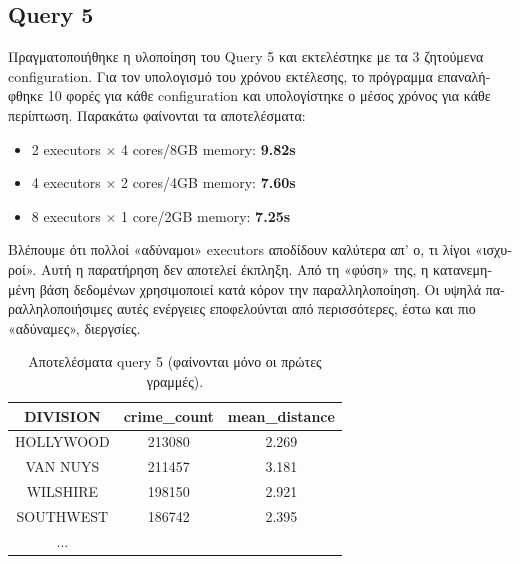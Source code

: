\documentclass[a4paper,12pt]{article}
\begin{document}
\begin{otherlanguage}{greek}
\section*{Query 5}
	\FloatBarrier
	\par Πραγματοποιήθηκε η υλοποίηση του Query 5 και εκτελέστηκε με τα 3
	ζητούμενα configuration. Για τον υπολογισμό του χρόνου εκτέλεσης, το πρόγραμμα
	επαναλήφθηκε 10 φορές για κάθε configuration και υπολογίστηκε ο μέσος χρόνος για
	κάθε περίπτωση. Παρακάτω φαίνονται τα αποτελέσματα:
	\begin{itemize}
		\item 2 executors $\times$ 4 cores/8GB memory: \textbf{9.82s}
		\item 4 executors $\times$ 2 cores/4GB memory: \textbf{7.60s}
		\item 8 executors $\times$ 1 core/2GB memory: \textbf{7.25s}
	\end{itemize}
	\par Βλέπουμε ότι πολλοί «αδύναμοι» executors αποδίδουν καλύτερα απ' ο, τι λίγοι
	«ισχυροί». Αυτή η παρατήρηση δεν αποτελεί έκπληξη. Από τη «φύση» της, η
	κατανεμημένη βάση δεδομένων χρησιμοποιεί κατά κόρον την παραλληλοποίηση. Οι
	υψηλά παραλληλοποιήσιμες αυτές ενέργειες εποφελούνται από περισσότερες, έστω
	και πιο «αδύναμες», διεργσίες.
	\begin{table}[h]
		\centering
		\begin{tabular}{ccc}
			DIVISION & crime\_count & mean\_distance \\
			\hline
			HOLLYWOOD & 213080 & 2.269 \\
			VAN NUYS & 211457 & 3.181 \\
			WILSHIRE & 198150 & 2.921 \\
			SOUTHWEST & 186742 & 2.395 \\
			...
		\end{tabular}
		\caption{Aποτελέσματα query 5 (φαίνονται μόνο οι 
		πρώτες γραμμές).}
	\end{table}
	\FloatBarrier

\FloatBarrier
\printbibliography

\end{otherlanguage}
\end{document}
